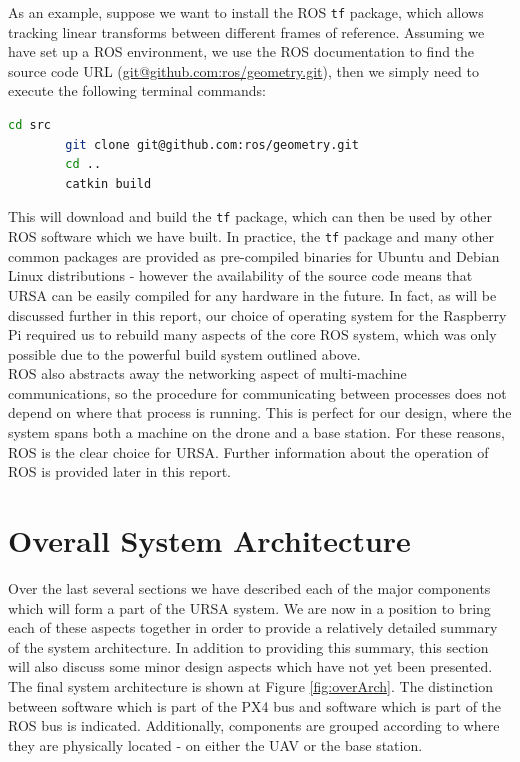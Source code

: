 \documentclass[capstone_report.tex]{subfiles}
\begin{document}
    As an example, suppose we want to install the ROS \texttt{tf} package, which allows tracking linear transforms between different frames of reference. Assuming we have set up a ROS environment, we use the ROS documentation to find the source code URL (\url{git@github.com:ros/geometry.git}), then we simply need to execute the following terminal commands:

    \begin{lstlisting}[language=bash]
    	cd src
    	git clone git@github.com:ros/geometry.git
    	cd ..
    	catkin build
	\end{lstlisting}

	This will download and build the \texttt{tf} package, which can then be used by other ROS software which we have built. In practice, the \texttt{tf} package and many other common packages are provided as pre-compiled binaries for Ubuntu and Debian Linux distributions - however the availability of the source code means that URSA can be easily compiled for any hardware in the future. In fact, as will be discussed further in this report, our choice of operating system for the Raspberry Pi required us to rebuild many aspects of the core ROS system, which was only possible due to the powerful build system outlined above.\\

	ROS also abstracts away the networking aspect of multi-machine communications, so the procedure for communicating between processes does not depend on where that process is running. This is perfect for our design, where the system spans both a machine on the drone and a base station. For these reasons, ROS is the clear choice for URSA. Further information about the operation of ROS is provided later in this report.

	\section{Overall System Architecture}
	Over the last several sections we have described each of the major components which will form a part of the URSA system. We are now in a position to bring each of these aspects together in order to provide a relatively detailed summary of the system architecture. In addition to providing this summary, this section will also discuss some minor design aspects which have not yet been presented. The final system architecture is shown at Figure \ref{fig:overArch}. The distinction between software which is part of the PX4 bus and software which is part of the ROS bus is indicated. Additionally, components are grouped according to where they are physically located - on either the UAV or the base station. \\
\end{document}
